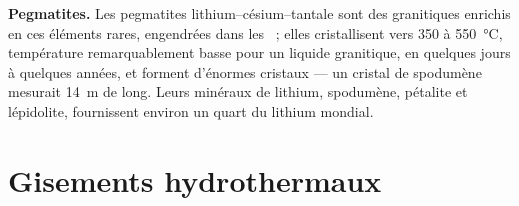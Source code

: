\textbf{Pegmatites.} Les pegmatites lithium--césium--tantale sont des  granitiques enrichis en
ces éléments rares, engendrées dans les ~; elles cristallisent vers 350 à
\qty{550}{\celsius}, température remarquablement basse pour un liquide granitique, en quelques jours
à quelques années, et forment d'énormes cristaux --- un cristal de spodumène mesurait \qty{14}{m} de long.
Leurs minéraux de lithium, spodumène, pétalite et lépidolite, fournissent environ un quart du lithium mondial.

\section{Gisements hydrothermaux}\label{sec:b2:ore-deposits:hydrothermal}

